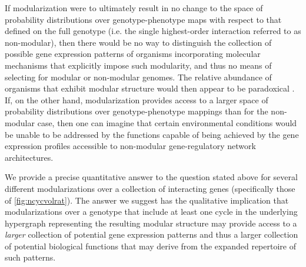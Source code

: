 If modularization were to ultimately result in no change to the space of probability distributions over genotype-phenotype maps with respect to that defined on the full genotype (i.e. the single highest-order interaction referred to as non-modular), then there would be no way to distinguish the collection of possible gene expression patterns of organisms incorporating molecular mechanisms that explicitly impose such modularity, and thus no means of selecting for modular or non-modular genomes. The relative abundance of organisms that exhibit modular structure would then appear to be paradoxical \cite{Jothi2009,Colm}. If, on the other hand, modularization provides access to a larger space of probability distributions over genotype-phenotype mappings than for the non-modular case, then one can imagine that certain environmental conditions would be unable to be addressed by the functions capable of being achieved by the gene expression profiles accessible to non-modular gene-regulatory network architectures.

We provide a precise quantitative answer to the question stated above for several different modularizations over a collection of interacting genes (specifically those of \ref{fig:ncycvolrat}). The answer we suggest has the qualitative implication that modularizations over a genotype that include at least one cycle in the underlying hypergraph representing the resulting modular structure may provide access to a \emph{larger} collection of potential gene expression patterns and thus a larger collection of potential biological functions that may derive from the expanded repertoire of such patterns.
